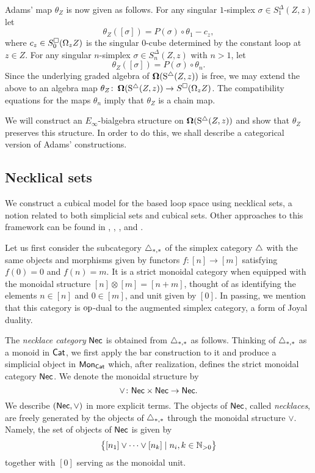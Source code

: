 Adams' map $\theta_Z$ is now given as follows.
For any singular $1$-simplex $\sigma \in S^{\Delta}_1(Z, z)$ let
$$\theta_Z([\sigma])= P(\sigma) \circ \theta_1 - c_z,$$
where $c_z \in S^{\square}_0(\Omega_z Z)$ is the singular $0$-cube determined by the constant loop at $z \in Z.$ For any singular $n$-simplex $\sigma \in S^{\Delta}_n(Z, z)$ with $n>1$, let
$$\theta_Z([\sigma])= P(\sigma) \circ \theta_n.$$ Since the underlying graded algebra of $\operatorname{\mathbf{\Omega}}(\operatorname{S^{\triangle}}(Z, z))$ is free, we may extend the above to an algebra map $\theta_Z \colon \operatorname{\mathbf{\Omega}}(\operatorname{S^{\triangle}}(Z, z)) \to S^{\square}(\Omega_z Z)$.
The compatibility equations for the maps $\theta_n$ imply that $\theta_Z$ is a chain map.

We will construct an $E_{\infty}$-bialgebra structure on $\operatorname{\mathbf{\Omega}}(\operatorname{S^{\triangle}}(Z, z))$ and show that $\theta_Z$ preserves this structure.
In order to do this, we shall describe a categorical version of Adams' constructions.

\subsection{Necklical sets}

We construct a cubical model for the based loop space using necklical sets, a notion related to both simplicial sets and cubical sets.
Other approaches to this framework can be found in \cite{baues1998hopf}, \cite{galvez2020hopf}, \cite{dugger2011rigidification}, and \cite{rivera2018cubical, rivera2019path}.

Let us first consider the subcategory $\triangle_{*,*}$ of the simplex category $\triangle$ with the same objects and morphisms given by functors $f \colon [n] \to [m]$ satisfying $f(0) = 0$ and $f(n) = m$.
It is a strict monoidal category when equipped with the monoidal structure $[n] \otimes [m] = [n+m]$, thought of as identifying the elements $n \in [n]$ and $0 \in [m]$, and unit given by $[0]$.
In passing, we mention that this category is $\mathrm{op}$-dual to the augmented simplex category, a form of Joyal duality.

The \textit{necklace category} $\mathsf{Nec}$ is obtained from $\triangle_{*,*}$ as follows.
Thinking of $\triangle_{*,*}$ as a monoid in $\mathsf{Cat}$, we first apply the bar construction to it and produce a simplicial object in $\mathsf{Mon}_{\mathsf{Cat}}$ which, after realization, defines the strict monoidal category $\mathsf{Nec}$. We denote the monoidal structure by 
\[\vee \colon \mathsf{Nec} \times \mathsf{Nec} \to \mathsf{Nec}.\]
We describe $(\mathsf{Nec}, \vee)$ in more explicit terms. The objects of $\mathsf{Nec}$, called \textit{necklaces}, are freely generated by the objects of $\triangle_{*,*}$ through the monoidal structure $\vee$. Namely, the set of objects of $\mathsf{Nec}$ is given by
\begin{equation*}
\big\{ [n_1] \vee \cdots \vee[n_k] \mid n_i, k \in \mathbb{N}_{>0} \big\}
\end{equation*}
together with $[0]$ serving as the monoidal unit. 

